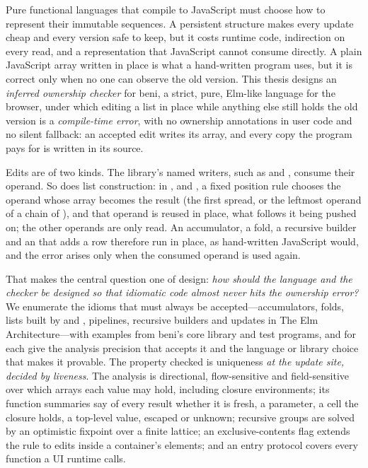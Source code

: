 Pure functional languages that compile to JavaScript must choose how to represent their immutable
sequences. A persistent structure makes every update cheap and every version safe to keep, but it
costs runtime code, indirection on every read, and a representation that JavaScript cannot consume
directly. A plain JavaScript array written in place is what a hand-written program uses, but it is
correct only when no one can observe the old version. This thesis designs an \emph{inferred
ownership checker} for beni, a strict, pure, Elm-like language for the browser, under which editing a
list in place while anything else still holds the old version is a \emph{compile-time error}, with no
ownership annotations in user code and no silent fallback: an accepted edit writes its array, and
every copy the program pays for is written in its source.

Edits are of two kinds. The library's named writers, such as  and ,
consume their operand. So does list construction: in \code{[ …acc, x ]}, \code{[ …acc, …ys ]} and
, a fixed position rule chooses the operand whose array becomes the result (the
first spread, or the leftmost operand of a chain of \code{++}), and that operand is reused in place, what
follows it being pushed on; the other operands are only read. An accumulator, a fold, a recursive builder
and an  that adds a row therefore run in place, as hand-written JavaScript would, and the
error arises only when the consumed operand is used again.

That makes the central question one of design: \emph{how should the language and the checker be
designed so that idiomatic code almost never hits the ownership error?} We enumerate the idioms that
must always be accepted---accumulators, folds, lists built by  and , pipelines,
recursive builders and updates in The Elm Architecture---with examples from beni's core library and
test programs, and for each give the analysis precision that accepts it and the language or library
choice that makes it provable. The property checked is uniqueness \emph{at the update site, decided
by liveness}. The analysis is directional, flow-sensitive and field-sensitive over which arrays each
value may hold, including closure environments; its function summaries say of every result whether
it is fresh, a parameter, a cell the closure holds, a top-level value, escaped or unknown; recursive
groups are solved by an optimistic fixpoint over a finite lattice; an exclusive-contents flag extends
the rule to edits inside a container's elements; and an entry protocol covers every function a UI
runtime calls.

